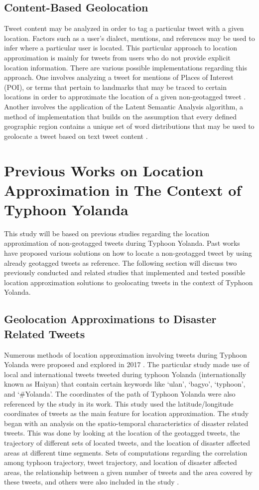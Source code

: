 \subsection{Content-Based Geolocation}
Tweet content may be analyzed in order to tag a particular tweet with a given location. Factors such as a user’s dialect, mentions, and references may be used to infer where a particular user is located. This particular approach to location approximation is mainly for tweets from users who do not provide explicit location information. There are various possible implementations regarding this approach. One involves analyzing a tweet for mentions of Places of Interest (POI), or terms that pertain to landmarks that may be traced to certain locations in order to approximate the location of a given non-geotagged tweet \cite{L22014, CHENGCAVARLEELEE2010}.  Another involves the application of the Latent Semantic Analysis algorithm, a method of implementation that builds on the assumption that every defined geographic region contains a unique set of word distributions that may be used to geolocate a tweet based on text tweet content \cite{ROSALES2017, VELASCOBERMEJODOMINGO2018}.

\section {Previous Works on Location Approximation in The Context of Typhoon Yolanda }
This study will be based on previous studies regarding the location approximation of non-geotagged tweets during Typhoon Yolanda. Past works have proposed various solutions on how to locate a non-geotagged tweet by using already geotagged tweets as reference. The following section will discuss two previously conducted and related studies that implemented and tested possible location approximation solutions to geolocating tweets in the context of Typhoon Yolanda.

\subsection{Geolocation Approximations to Disaster Related Tweets}
Numerous methods of location approximation involving tweets during Typhoon Yolanda were proposed and explored in 2017 \cite{ROSALES2017}. The particular study made use of local and international tweets tweeted during typhoon Yolanda (internationally known as Haiyan) that contain certain keywords like ‘ulan’, ‘bagyo’, ‘typhoon’, and ‘\#Yolanda’. The coordinates of the path of Typhoon Yolanda were also referenced by the study in its work. This study used the latitude/longitude coordinates of tweets as the main feature for location approximation. The study began with an analysis on the spatio-temporal characteristics of disaster related tweets. This was done by looking at the location of the geotagged tweets, the trajectory of different sets of located tweets, and the location of disaster affected areas at different time segments. Sets of computations regarding the correlation among typhoon trajectory, tweet trajectory, and location of disaster affected areas, the relationship between a given number of tweets and the area covered by these tweets, and others were also included in the study \cite{ROSALES2017}.

